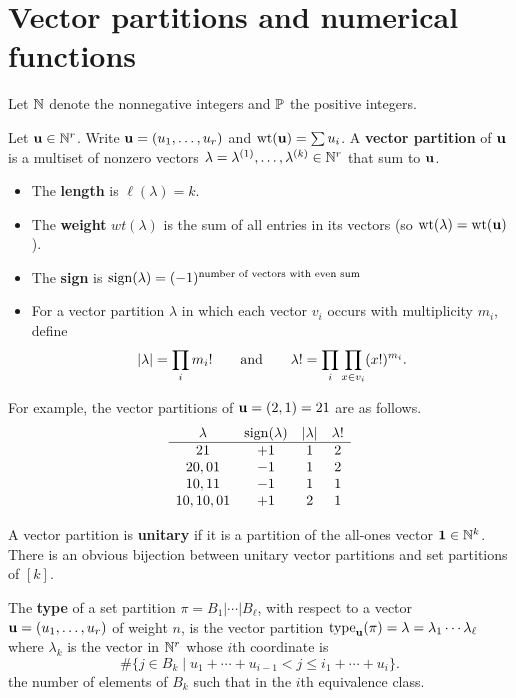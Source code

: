 
\newcommand{\Mac}{\mathfrak{M}}
\DeclareMathOperator{\type}{type}


\section{Vector partitions and numerical functions}

Let $\mathbb{N}$ denote the nonnegative integers and $\mathbb{P}$ the positive integers.

Let $\mathbf{u}\in\mathbb{N}^r$.  Write $\mathbf{u}=(u_1,\dots,u_r)$ and $\operatorname{wt}(\mathbf{u})=\sum u_i$.  A \textbf{vector partition} of $\mathbf{u}$ is a multiset of nonzero vectors $\lambda=\lambda^{(1)},\dots,\lambda^{(k)}\in\mathbb{N}^r$ that sum to $\mathbf{u}$.
 
\begin{itemize}
\item The \textbf{length} is $\ell(\lambda)=k$.
\item The \textbf{weight} $wt(\lambda)$ is the sum of all entries in its vectors (so $\operatorname{wt}(\lambda)=\operatorname{wt}(\mathbf{u})$).
\item The \textbf{sign} is $\operatorname{sign}(\lambda)=(-1)^{\text{number of vectors with even sum}}$
\item For a vector partition $\lambda$ in which each vector $v_i$ occurs with multiplicity $m_i$, define
\[|\lambda|=\prod_im_i! \qquad\text{and}\qquad \lambda!=\prod_i\prod_{x\in v_i}(x!)^{m_i}.\]
\end{itemize}

For example, the vector partitions of $\mathbf{u}=(2,1)=21$ are as follows.
\[\begin{array}{cccc}
\lambda & \operatorname{sign}(\lambda) & |\lambda| & \lambda!\\ \hline
21 & +1 & 1 & 2\\
20,01 & -1 & 1  & 2\\
10,11 & -1 & 1 & 1\\
10,10,01 & +1 & 2 & 1 
\end{array}\]

A vector partition is \textbf{unitary} if it is a partition of the all-ones vector $\mathbf{1}\in\mathbb{N}^k$.  There is an obvious bijection between unitary vector partitions and set partitions of $[k]$.

The \textbf{type} of a set partition $\pi=B_1|\cdots|B_\ell$, with respect to a vector $\mathbf{u}=(u_1,\dots,u_r)$ of weight $n$, is the vector partition $\type_\uu(\pi)=\lambda=\lambda_1\cdots\lambda_\ell$ where $\lambda_k$ is the vector in $\mathbb{N}^r$ whose $i$th coordinate is
\[\#\{j\in B_k \mid u_1+\cdots+u_{i-1} < j \leq i_1+\cdots+u_i\}.\]
 the number of elements of $B_k$ such that
in the $i$th equivalence class.


